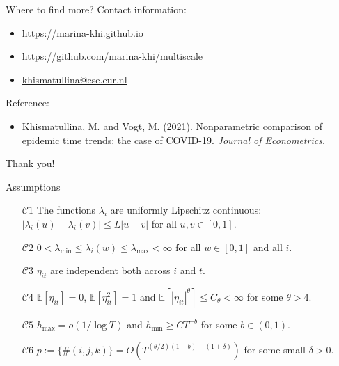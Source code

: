 \documentclass[10pt]{beamer}
\newcommand{\E}{\mathbb{E}}
\begin{document}
\begin{frame}{Where to find more?}
	Contact information:
	\begin{itemize}
		\item \url{https://marina-khi.github.io}
		\item \url{https://github.com/marina-khi/multiscale}
		\item \href{mailto:khismatullina@ese.eur.nl}{khismatullina@ese.eur.nl}
	\end{itemize}
	Reference:
	\begin{itemize}
		\vspace{-1mm}
		\item Khismatullina, M. and Vogt, M. (2021). Nonparametric comparison of epidemic time trends: the case of COVID-19. \textit{Journal of Econometrics.}
	\end{itemize}
\end{frame}

\begin{frame}[standout]
  Thank you!
\end{frame}


\appendix

\begin{frame}{Assumptions}
\begin{itemize}
\item[$\mathcal{C}1$] \label{C1} The functions $\lambda_i$ are uniformly Lipschitz continuous: $|\lambda_i(u) - \lambda_i(v)| \le L |u-v|$ for all $u, v \in [0,1]$.
\item[$\mathcal{C}2$] \label{C2} $0 < \lambda_{\min} \le \lambda_i(w) \le \lambda_{\max} < \infty$ for all $w \in [0, 1]$ and all $i$. 
\item[$\mathcal{C}3$] \label{C3} $\eta_{it}$ are independent both across $i$ and $t$.
\item[$\mathcal{C}4$] \label{C4} $\E[\eta_{it}] = 0$, $\E[\eta_{it}^2] = 1$ and $\E[|\eta_{it}|^\theta] \le C_\theta < \infty$ for some $\theta > 4$. 
\item[$\mathcal{C}5$] \label{C5} $h_{\max} = o(1/\log T)$ and $h_{\min} \ge CT^{-b}$ for some $b \in (0,1)$.
\item[$\mathcal{C}6$] \label{C6} $p := \{ \# (i, j, k) \} = O(T^{(\theta/2)(1-b)-(1+\delta)})$ for some small $\delta > 0$.
\end{itemize}
\end{frame}
\end{document}
